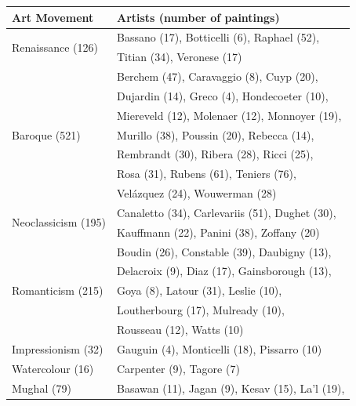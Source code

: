 \documentclass[11pt,a4paper,twoside,openright]{report}
\begin{document}
\begin{table}[htp]
\centering
\begin{tabular}{|l|l|}
\toprule
Art Movement & Artists (number of paintings) \\
\bottomrule \toprule
\multirow{2}{*}{Renaissance (126)}
                     &  Bassano (17), Botticelli (6), Raphael (52), \\
                     &  Titian (34), Veronese (17)                  \\
\midrule
\multirow{7}{*}{Baroque (521)}
                     &  Berchem (47), Caravaggio (8), Cuyp (20),      \\
                     &  Dujardin (14), Greco (4), Hondecoeter (10),   \\
                     &  Miereveld (12), Molenaer (12), Monnoyer (19), \\
                     &  Murillo (38), Poussin (20), Rebecca (14),     \\
                     &  Rembrandt (30), Ribera (28), Ricci (25),      \\
                     &  Rosa (31), Rubens (61), Teniers (76),         \\
                     &  Vel\'azquez (24), Wouwerman (28)              \\
\midrule
\multirow{2}{*}{Neoclassicism (195)}
                     &  Canaletto (34), Carlevariis (51), Dughet (30), \\
                     &  Kauffmann (22), Panini (38), Zoffany (20)      \\
\midrule
\multirow{5}{*}{Romanticism (215)}
                     &  Boudin (26), Constable (39), Daubigny (13),  \\
                     &  Delacroix (9), Diaz (17), Gainsborough (13), \\
                     &  Goya (8), Latour (31), Leslie (10),          \\
                     &  Loutherbourg (17), Mulready (10),            \\
                     &  Rousseau (12),  Watts (10)                   \\
\midrule
Impressionism (32)   &  Gauguin (4), Monticelli (18), Pissarro (10) \\
\bottomrule \toprule
Watercolour (16)     &  Carpenter (9), Tagore (7) \\
\midrule
\multirow{2}{*}{Mughal (79)}
                     &  Basawan (11), Jagan (9), Kesav (15), La'l (19), \\

\end{tabular}
\end{table}
\end{document}
